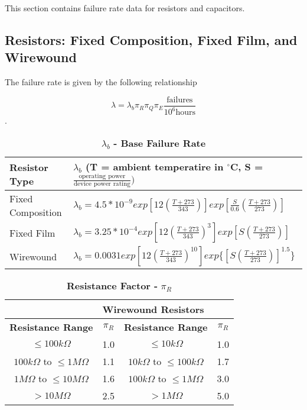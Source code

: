 This section contains failure rate data for resistors and capacitors.

\subsection{Resistors: Fixed Composition, Fixed Film, and Wirewound}
\label{section:resistors-fixed-composition-fixed-film-and-wirewound}

The failure rate is given by the following relationship

$$\lambda = \lambda_{b} \pi_{R} \pi_{Q} \pi_{E} \frac{\text{failures}}{10^{6} \text{hours}}$$.


\begin{table}[h]
\caption{$\lambda_{b} $ \textbf{- Base Failure Rate}}
\label{table:baseFailureRateResistorCapacitor}
\begin{tabular}{|l|m{10cm}|} \hline
\rowcolor{Gray}
\T \textbf{Resistor Type} &
$\lambda_b$ 
(T = ambient temperatire in $^\circ$C, 
S = $\frac{\text{operating power}}{\text{device power rating}})$ \B \\ \hline
\T Fixed Composition & 
$\lambda_b = 4.5*10^{-9} exp [12(\frac{T+273}{343})] exp[\frac{S}{0.6}(\frac{T+273}{273})]$ \B \\ \hline
\T Fixed Film &
$\lambda_b = 3.25*10^{-4} exp [12(\frac{T+273}{343})^3] exp[S(\frac{T+273}{273})]$ \B \\ \hline
\T Wirewound &
$\lambda_b = 0.0031 exp [12(\frac{T+273}{343})^{10}] exp\{[S(\frac{T+273}{273})]^{1.5}\}$ \B \\ \hline
\end{tabular}
\end{table}




\begin{table}[h]
\caption{\textbf{Resistance Factor -} $\pi_{R}$}
\label{table:resistanceFactor}
\begin{tabular}{|c|c|c|c|} \hline
\rowcolor{Gray}
\multicolumn{2}{|l|}{\textbf{Fixed Composition or Fixed Film Resistors}} &  \multicolumn{2}{|l|}{\textbf{Wirewound Resistors}} \\ \hline
\rowcolor{Gray}
\textbf{Resistance Range} & $\pi_{R}$ & \textbf{Resistance Range} & $\pi_{R}$ \\ \hline
$ \leq 100k\Omega$                            & 1.0 & $ \leq 10k\Omega$                                     & 1.0 \\ \hline
$ 100k\Omega$ to $\leq 1M\Omega$ & 1.1 & $ 10k\Omega$ to $\leq 100k\Omega$  & 1.7 \\ \hline
$ 1M\Omega$ to $\leq 10M\Omega$  & 1.6 & $ 100k\Omega$ to $\leq 1M\Omega$  & 3.0 \\ \hline
$ > 10M\Omega$                                 & 2.5 & $ > 1M\Omega$                                     & 5.0 \\ \hline
\end{tabular}
\end{table}



